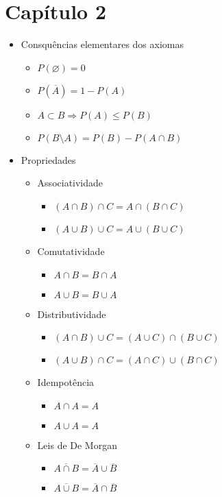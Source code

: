 \documentclass[a4paper]{report}
\begin{document}
	\begin{center}
		\LARGE{}
	\end{center}
	\section*{Capítulo 2}
	\begin{itemize}
		\item Consquências elementares dos axiomas
		\begin{itemize}
			\item $P(\varnothing)=0$
			\item $P(\overline A)=1-P(A)$
			\item $A\subset B\Rightarrow P(A)\leq P(B)$
			\item $P(B\setminus A)=P(B)-P(A\cap B)$
		\end{itemize}
		\item Propriedades
		\begin{itemize}
			\item Associatividade
			\begin{itemize}
				\item $(A\cap B)\cap C=A\cap (B\cap C)$
				\item $(A\cup B)\cup C=A\cup (B\cup C)$
			\end{itemize}
			\item Comutatividade
			\begin{itemize}
				\item $A\cap B=B\cap A$
				\item $A\cup B=B\cup A$
			\end{itemize}
			\item Distributividade
			\begin{itemize}
				\item $(A\cap B)\cup C=(A\cup C)\cap (B\cup C)$
				\item $(A\cup B)\cap C=(A\cap C)\cup (B\cap C)$
			\end{itemize}
			\item Idempotência
			\begin{itemize}
				\item $A\cap A=A$
				\item $A\cup A=A$
			\end{itemize}
			\item Leis de De Morgan
			\begin{itemize}
				\item $\overline{A\cap B}=\overline A \cup \overline B$
				\item $\overline{A\cup B}=\overline A \cap \overline B$

\end{itemize}
\end{itemize}
\end{itemize}
\end{document}
